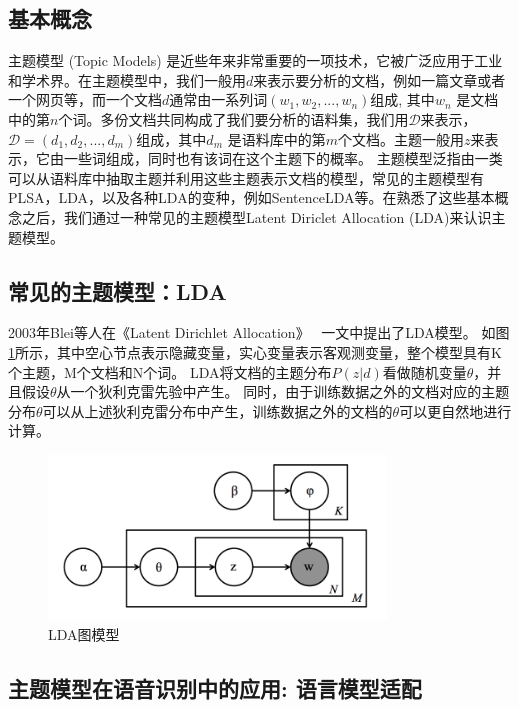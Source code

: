 \subsection{基本概念}
主题模型 (Topic Models) 是近些年来非常重要的一项技术，它被广泛应用于工业和学术界。在主题模型中，我们一般用$d$来表示要分析的文档，例如一篇文章或者一个网页等，而一个文档$d$通常由一系列词$(w_1, w_2, ..., w_n)$组成, 其中$w_n$ 是文档中的第$n$个词。多份文档共同构成了我们要分析的语料集，我们用$\mathcal{D}$来表示，$\mathcal{D}=(d_1, d_2, ..., d_m)$组成，其中$d_m$ 是语料库中的第$m$个文档。主题一般用$z$来表示，它由一些词组成，同时也有该词在这个主题下的概率。
主题模型泛指由一类可以从语料库中抽取主题并利用这些主题表示文档的模型，常见的主题模型有PLSA，LDA，以及各种LDA的变种，例如SentenceLDA等。在熟悉了这些基本概念之后，我们通过一种常见的主题模型Latent Diriclet Allocation (LDA)来认识主题模型。




\subsection{常见的主题模型：LDA}

2003年Blei等人在《Latent Dirichlet Allocation》~\cite{blei2003latent} 一文中提出了LDA模型。
如图\ref{pic:lda}所示，其中空心节点表示隐藏变量，实心变量表示客观测变量，整个模型具有K个主题，M个文档和N个词。
LDA将文档的主题分布$P(z|d)$看做随机变量$\theta$，并且假设$\theta$从一个狄利克雷先验中产生。
同时，由于训练数据之外的文档对应的主题分布$\theta$可以从上述狄利克雷分布中产生，训练数据之外的文档的$\theta$可以更自然地进行计算。

\begin{figure}[htb]
	\begin{center}
		\includegraphics[width=0.8\textwidth]{img/chapter_lm/lda.png}
		\caption{LDA图模型}
		\label{pic:lda}
	\end{center}
\end{figure}

\subsection{主题模型在语音识别中的应用: 语言模型适配}

